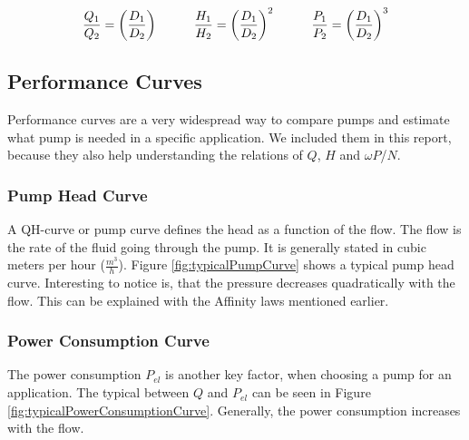 \begin{equation}
	\frac{Q_1}{Q_2} = \left(\frac{D_1}{D_2}\right)
	\hspace{10mm}
	\frac{H_1}{H_2} = \left(\frac{D_1}{D_2}\right)^2
	\hspace{10mm}
	\frac{P_1}{P_2} = \left(\frac{D_1}{D_2}\right)^3
	\label{eq:afflaw2}	
\end{equation}
\cite{Volk2014}

\subsection{Performance Curves}
Performance curves are a very widespread way to compare pumps
and estimate what pump is needed in a specific application.
We included them in this report,
because they also help understanding the relations of $Q$, $H$ and $\omega P$/$N$.

\subsubsection{Pump Head Curve}
A QH-curve or pump curve defines the head as a function of the flow. 
The flow is the rate of the fluid going through the pump.
It is generally stated in cubic meters per hour ($\frac{m^{3}}{h}$).
Figure \ref{fig:typicalPumpCurve} shows a typical pump head curve.
Interesting to notice is,
that the pressure decreases quadratically with the flow.
This can be explained with the Affinity laws mentioned earlier.


\subsubsection{Power Consumption Curve}
The power consumption $P_{el}$ is another key factor,
when choosing a pump for an application.
The typical between $Q$ and $P_{el}$ can be seen in Figure \ref{fig:typicalPowerConsumptionCurve}.
Generally, the power consumption increases with the flow.


